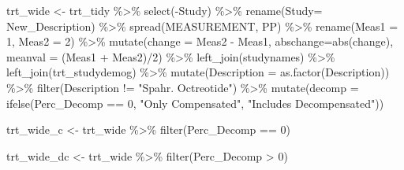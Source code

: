 \documentclass[
]{article}
\newenvironment{Shaded}{\begin{snugshade}}{\end{snugshade}}
\newcommand{\AttributeTok}[1]{\textcolor[rgb]{0.77,0.63,0.00}{#1}}
\newcommand{\DecValTok}[1]{\textcolor[rgb]{0.00,0.00,0.81}{#1}}
\newcommand{\FunctionTok}[1]{\textcolor[rgb]{0.00,0.00,0.00}{#1}}
\newcommand{\NormalTok}[1]{#1}
\newcommand{\OtherTok}[1]{\textcolor[rgb]{0.56,0.35,0.01}{#1}}
\newcommand{\SpecialCharTok}[1]{\textcolor[rgb]{0.00,0.00,0.00}{#1}}
\newcommand{\StringTok}[1]{\textcolor[rgb]{0.31,0.60,0.02}{#1}}
\begin{document}
\begin{Shaded}
\begin{Highlighting}[]
\NormalTok{trt\_wide }\OtherTok{\textless{}{-}}\NormalTok{ trt\_tidy }\SpecialCharTok{\%\textgreater{}\%} 
  \FunctionTok{select}\NormalTok{(}\SpecialCharTok{{-}}\NormalTok{Study) }\SpecialCharTok{\%\textgreater{}\%}
  \FunctionTok{rename}\NormalTok{(}\AttributeTok{Study=}\NormalTok{ New\_Description) }\SpecialCharTok{\%\textgreater{}\%} 
  \FunctionTok{spread}\NormalTok{(MEASUREMENT, PP) }\SpecialCharTok{\%\textgreater{}\%} 
  \FunctionTok{rename}\NormalTok{(}\AttributeTok{Meas1 =} \StringTok{\textasciigrave{}}\AttributeTok{1}\StringTok{\textasciigrave{}}\NormalTok{,}
         \AttributeTok{Meas2 =} \StringTok{\textasciigrave{}}\AttributeTok{2}\StringTok{\textasciigrave{}}\NormalTok{) }\SpecialCharTok{\%\textgreater{}\%} 
  \FunctionTok{mutate}\NormalTok{(}\AttributeTok{change =}\NormalTok{ Meas2 }\SpecialCharTok{{-}}\NormalTok{ Meas1,}
         \AttributeTok{abschange=}\FunctionTok{abs}\NormalTok{(change),}
         \AttributeTok{meanval =}\NormalTok{ (Meas1 }\SpecialCharTok{+}\NormalTok{ Meas2)}\SpecialCharTok{/}\DecValTok{2}\NormalTok{) }\SpecialCharTok{\%\textgreater{}\%} 
  \FunctionTok{left\_join}\NormalTok{(studynames) }\SpecialCharTok{\%\textgreater{}\%} 
  \FunctionTok{left\_join}\NormalTok{(trt\_studydemog) }\SpecialCharTok{\%\textgreater{}\%} 
  \FunctionTok{mutate}\NormalTok{(}\AttributeTok{Description =} \FunctionTok{as.factor}\NormalTok{(Description)) }\SpecialCharTok{\%\textgreater{}\%} 
  \FunctionTok{filter}\NormalTok{(Description }\SpecialCharTok{!=} \StringTok{"Spahr. Octreotide"}\NormalTok{) }\SpecialCharTok{\%\textgreater{}\%} 
  \FunctionTok{mutate}\NormalTok{(}\AttributeTok{decomp =} \FunctionTok{ifelse}\NormalTok{(Perc\_Decomp }\SpecialCharTok{==} \DecValTok{0}\NormalTok{,}
                         \StringTok{"Only Compensated"}\NormalTok{,}
                         \StringTok{"Includes Decompensated"}\NormalTok{))}


\NormalTok{trt\_wide\_c }\OtherTok{\textless{}{-}}\NormalTok{ trt\_wide }\SpecialCharTok{\%\textgreater{}\%} 
  \FunctionTok{filter}\NormalTok{(Perc\_Decomp }\SpecialCharTok{==} \DecValTok{0}\NormalTok{)}

\NormalTok{trt\_wide\_dc }\OtherTok{\textless{}{-}}\NormalTok{ trt\_wide }\SpecialCharTok{\%\textgreater{}\%} 
  \FunctionTok{filter}\NormalTok{(Perc\_Decomp }\SpecialCharTok{\textgreater{}} \DecValTok{0}\NormalTok{)}
\end{Highlighting}
\end{Shaded}
\end{document}
